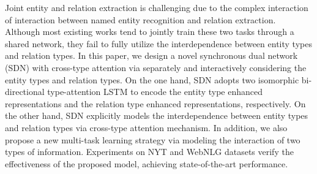 Joint entity and relation extraction is challenging due to the complex interaction of interaction between named entity recognition and relation extraction. Although most existing works tend to jointly train these two tasks through a shared network, they fail to fully utilize the interdependence between entity types and relation types. In this paper, we design a novel synchronous dual network (SDN) with cross-type attention via separately and interactively considering the entity types and relation types. On the one hand, SDN adopts two isomorphic bi-directional type-attention LSTM to encode the entity type enhanced representations and the relation type enhanced representations, respectively. On the other hand, SDN explicitly models the interdependence between entity types and relation types via cross-type attention mechanism. In addition, we also propose a new multi-task learning strategy via modeling the interaction of two types of information. Experiments on NYT and WebNLG datasets verify the effectiveness of the proposed model, achieving state-of-the-art performance.
